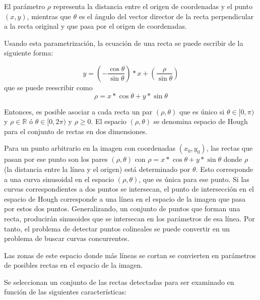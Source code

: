 El parámetro $\rho$ representa la distancia entre el origen de coordenadas y el punto$(x,y)$,
mientras que $\theta$ es el ángulo del vector director de la recta perpendicular a la recta original
y que pasa por el origen de coordenadas.

Usando esta parametrización, la ecuación de una recta se puede escribir de la siguiente forma:

\begin{equation}
y=(-\dfrac{\cos \theta}{\sin \theta}) * x + (\dfrac{\rho}{\sin \theta})
\end{equation}
que se puede reescribir como
\begin{equation}
\rho=x * \cos \theta + y * \sin \theta
\end{equation}

Entonces, es posible asociar a cada recta un par $(\rho,\theta)$ que es único si $\theta \in
[0,\pi)$ y $\rho \in \mathbb{R}$ ó $\theta \in [0,2\pi)$ y $\rho \geq 0$. El espacio
$(\rho,\theta)$ se denomina espacio de Hough para el conjunto de rectas en dos dimensiones.

Para un punto arbitrario en la imagen con coordenadas $(x_0,y_0)$, las rectas que pasan por ese punto
son los pares  $(\rho,\theta)$ con  $\rho=x*\cos \theta + y * \sin \theta$ donde $\rho$ (la
distancia entre la línea y el origen) está determinado por $\theta$. Esto corresponde a una curva
sinusoidal en el espacio  $(\rho,\theta)$, que es única para ese punto. Si las curvas
correspondientes  a dos puntos se intersecan, el punto de intersección en el espacio de Hough
corresponde  a una línea en el espacio de la imagen que pasa por estos dos puntos. Generalizando, un
conjunto de puntos que forman una recta, producirán sinusoides que se intersecan en los parámetros
de esa línea. Por tanto, el problema de detectar puntos colineales se puede convertir en un problema
de buscar curvas concurrentes.

Las zonas de este espacio donde más líneas se cortan se convierten en parámetros de posibles rectas
en el espacio de la imagen.

Se seleccionan un conjunto de las rectas detectadas para ser examinado en función de las siguientes características:

